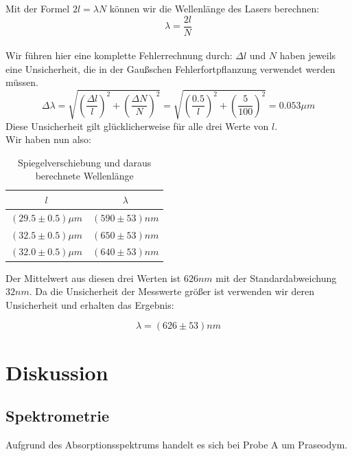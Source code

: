 \documentclass{article}
\begin{document}
Mit der Formel $2 l=\lambda N$ können wir die Wellenlänge des Lasers berechnen:
$$\lambda=\frac{2l}{N}$$
\\
Wir führen hier eine komplette Fehlerrechnung durch:
$\Delta l$ und $N$ haben jeweils eine Unsicherheit, die in der Gaußschen Fehlerfortpflanzung verwendet werden müssen.\\
$$\Delta \lambda=\sqrt{\left(\frac{\Delta l}{l}\right)^2+\left(\frac{\Delta N}{N}\right)^2}=\sqrt{\left(\frac{0.5}{l}\right)^2+\left(\frac{5}{100}\right)^2}=0.053 \mu m$$
Diese Unsicherheit gilt glücklicherweise für alle drei Werte von $l$.\\
Wir haben nun also: 
\begin{table}[H]
\begin{center}
\begin{tabular}{|c|c|}
\hline
$l$ & $\lambda$\\
\hline
$(29.5\pm 0.5)\mu m$ & $(590 \pm 53)nm$\\
$(32.5\pm 0.5)\mu m$ & $(650 \pm 53)nm$\\
$(32.0\pm 0.5)\mu m$ & $(640 \pm 53)nm$\\
\hline
\end{tabular}
\caption{Spiegelverschiebung und daraus berechnete Wellenlänge}
\end{center}
\end{table}
\vspace{0.3mm}

Der Mittelwert aus diesen drei Werten ist $626nm$ mit der Standardabweichung $32nm$. Da die Unsicherheit der Messwerte größer ist verwenden wir deren Unsicherheit und erhalten das Ergebnis:

$$\boxed{\lambda=(626 \pm 53)nm}$$

\section{Diskussion}	

\subsection{Spektrometrie}

Aufgrund des Absorptionsspektrums handelt es sich bei Probe A um Praseodym. \\
\end{document}
